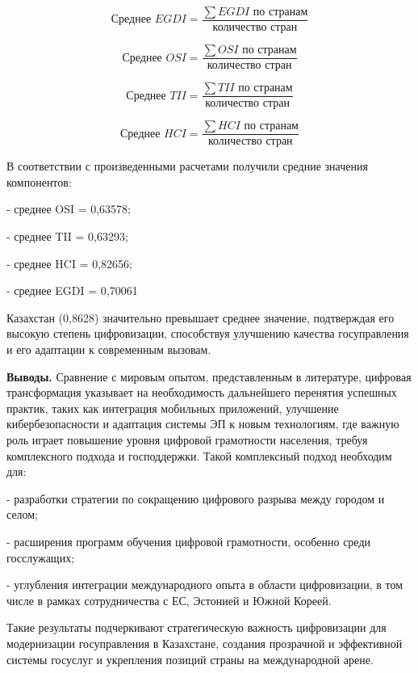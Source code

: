 \begin{multicols}{2}

\begin{equation}
    \text{Среднее } EGDI = \frac{\sum EGDI{\text{ по странам}}}{\text{количество стран}}
\end{equation}

\begin{equation}
    \text{Среднее } OSI = \frac{\sum OSI{\text{ по странам}}}{\text{количество стран}}
\end{equation}

\begin{equation}
    \text{Среднее } TII = \frac{\sum TII{\text{ по странам}}}{\text{количество стран}}
\end{equation}

\begin{equation}
    \text{Среднее } HCI = \frac{\sum HCI{\text{ по странам}}}{\text{количество стран}}
\end{equation}

В соответствии с произведенными расчетами получили средние значения
компонентов:

- среднее OSI = 0,63578;

- среднее TII = 0,63293;

- среднее HCI = 0,82656;

- среднее EGDI = 0,70061

Казахстан (0,8628) значительно превышает среднее значение, подтверждая
его высокую степень цифровизации, способствуя улучшению качества
госуправления и его адаптации к современным вызовам.

{\bfseries Выводы.} Сравнение с мировым опытом, представленным в
литературе, цифровая трансформация указывает на необходимость
дальнейшего перенятия успешных практик, таких как интеграция мобильных
приложений, улучшение кибербезопасности и адаптация системы ЭП к новым
технологиям, где важную роль играет повышение уровня цифровой
грамотности населения, требуя комплексного подхода и господдержки. Такой
комплексный подход необходим для:

- разработки стратегии по сокращению цифрового разрыва между городом и
селом;

- расширения программ обучения цифровой грамотности, особенно среди
госслужащих;

- углубления интеграции международного опыта в области цифровизации, в
том числе в рамках сотрудничества с ЕС, Эстонией и Южной Кореей.

Такие результаты подчеркивают стратегическую важность цифровизации для
модернизации госуправления в Казахстане, создания прозрачной и
эффективной системы госуслуг и укрепления позиций страны на
международной арене.
\end{multicols}

